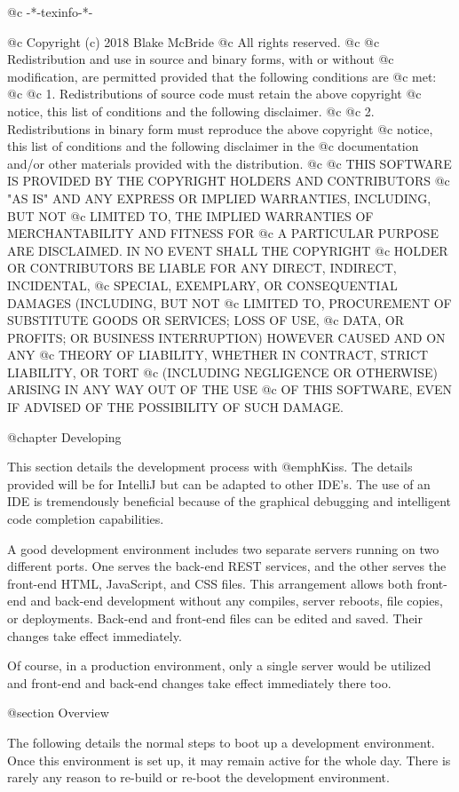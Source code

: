 @c -*-texinfo-*-

@c  Copyright (c) 2018 Blake McBride
@c  All rights reserved.
@c
@c  Redistribution and use in source and binary forms, with or without
@c  modification, are permitted provided that the following conditions are
@c  met:
@c
@c  1. Redistributions of source code must retain the above copyright
@c  notice, this list of conditions and the following disclaimer.
@c
@c  2. Redistributions in binary form must reproduce the above copyright
@c  notice, this list of conditions and the following disclaimer in the
@c  documentation and/or other materials provided with the distribution.
@c
@c  THIS SOFTWARE IS PROVIDED BY THE COPYRIGHT HOLDERS AND CONTRIBUTORS
@c  "AS IS" AND ANY EXPRESS OR IMPLIED WARRANTIES, INCLUDING, BUT NOT
@c  LIMITED TO, THE IMPLIED WARRANTIES OF MERCHANTABILITY AND FITNESS FOR
@c  A PARTICULAR PURPOSE ARE DISCLAIMED. IN NO EVENT SHALL THE COPYRIGHT
@c  HOLDER OR CONTRIBUTORS BE LIABLE FOR ANY DIRECT, INDIRECT, INCIDENTAL,
@c  SPECIAL, EXEMPLARY, OR CONSEQUENTIAL DAMAGES (INCLUDING, BUT NOT
@c  LIMITED TO, PROCUREMENT OF SUBSTITUTE GOODS OR SERVICES; LOSS OF USE,
@c  DATA, OR PROFITS; OR BUSINESS INTERRUPTION) HOWEVER CAUSED AND ON ANY
@c  THEORY OF LIABILITY, WHETHER IN CONTRACT, STRICT LIABILITY, OR TORT
@c  (INCLUDING NEGLIGENCE OR OTHERWISE) ARISING IN ANY WAY OUT OF THE USE
@c  OF THIS SOFTWARE, EVEN IF ADVISED OF THE POSSIBILITY OF SUCH DAMAGE.


@chapter Developing

This section details the development process with @emph{Kiss}.  The
details provided will be for IntelliJ but can be adapted to other
IDE's.  The use of an IDE is tremendously beneficial because of the
graphical debugging and intelligent code completion capabilities.

A good development environment includes two separate servers running
on two different ports.  One serves the back-end REST services, and
the other serves the front-end HTML, JavaScript, and CSS files.  This
arrangement allows both front-end and back-end development without any
compiles, server reboots, file copies, or deployments.  Back-end and
front-end files can be edited and saved.  Their changes take effect
immediately.

Of course, in a production environment, only a single server would be
utilized and front-end and back-end changes take effect immediately
there too.

@section Overview

The following details the normal steps to boot up a development environment.
Once this environment is set up, it may remain active for the whole day.
There is rarely any reason to re-build or re-boot the development environment.

